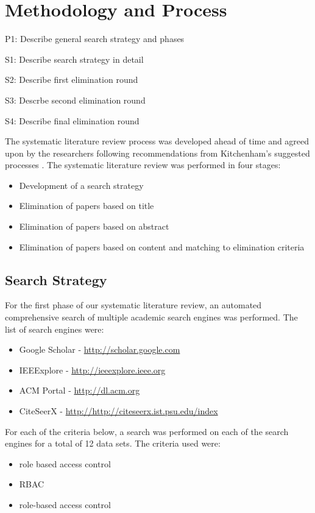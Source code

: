 \section{Methodology and Process} \label{sec:process}

P1: Describe general search strategy and phases

S1: Describe search strategy in detail

S2: Describe first elimination round

S3: Descrbe second elimination round

S4: Describe final elimination round

The systematic literature review process was developed ahead of time and agreed upon by the researchers following recommendations from Kitchenham's suggested processes \cite{kitchenham2007guidelines}.  The systematic literature review was performed in four stages:

\begin{itemize}
\item Development of a search strategy
\item Elimination of papers based on title
\item Elimination of papers based on abstract
\item Elimination of papers based on content and matching to elimination criteria
\end{itemize}

\subsection{Search Strategy}

For the first phase of our systematic literature review, an automated comprehensive search of multiple academic search engines was performed. The list of search engines were:

\begin{itemize}
\item Google Scholar - \url{http://scholar.google.com}
\item IEEExplore - \url{http://ieeexplore.ieee.org}
\item ACM Portal - \url{http://dl.acm.org}
\item CiteSeerX - \url{http://http://citeseerx.ist.psu.edu/index}
\end{itemize}

For each of the criteria below, a search was performed on each of the search engines for a total of 12 data sets.  The criteria used were:
\begin{itemize}
\item role based access control
\item RBAC
\item role-based access control
\end{itemize}

